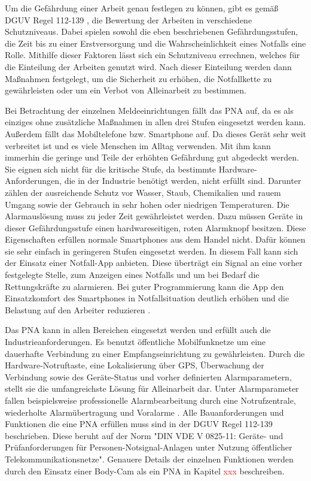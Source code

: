 \documentclass[thesis.tex]{subfiles}
\begin{document}
Um die Gefährdung einer Arbeit genau festlegen zu können, gibt es gemäß DGUV Regel 112-139 \cite[]{Regel_112-139}, die Bewertung der Arbeiten in verschiedene Schutzniveaus.
Dabei spielen sowohl die eben beschriebenen Gefährdungsstufen, die Zeit bis zu einer Erstversorgung und die Wahrscheinlichkeit eines Notfalls eine Rolle.
Mithilfe dieser Faktoren lässt sich ein Schutzniveau errechnen, welches für die Einteilung der Arbeiten genutzt wird.
Nach dieser Einteilung werden dann Maßnahmen festgelegt, um die Sicherheit zu erhöhen, die Notfallkette zu gewährleisten oder um ein Verbot von Alleinarbeit zu bestimmen.

Bei Betrachtung der einzelnen Meldeeinrichtungen fällt das PNA auf, da es als einziges ohne zusätzliche Maßnahmen in allen drei Stufen eingesetzt werden kann.
Außerdem fällt das Mobiltelefone bzw. Smartphone auf.
Da dieses Gerät sehr weit verbreitet ist und es viele Menschen im Alltag verwenden.
Mit ihm kann immerhin die geringe und Teile der erhöhten Gefährdung gut abgedeckt werden.
Sie eignen sich nicht für die kritische Stufe, da bestimmte Hardware-Anforderungen, die in der Industrie benötigt werden, nicht erfüllt sind.
Darunter zählen der ausreichende Schutz vor Wasser, Staub, Chemikalien und rauem Umgang sowie der Gebrauch in sehr hohen oder niedrigen Temperaturen.
Die Alarmauslösung muss zu jeder Zeit gewährleistet werden.
Dazu müssen Geräte in dieser Gefährdungsstufe einen hardwareseitigen, roten Alarmknopf besitzen.
Diese Eigenschaften erfüllen normale Smartphones aus dem Handel nicht.
Dafür können sie sehr einfach in geringeren Stufen eingesetzt werden.
In diesem Fall kann sich der Einsatz einer Notfall-App anbieten.
Diese überträgt ein Signal an eine vorher festgelegte Stelle, zum Anzeigen eines Notfalls und um bei Bedarf die Rettungskräfte zu alarmieren.
Bei guter Programmierung kann die App den Einsatzkomfort des Smartphones in Notfallsituation deutlich erhöhen und die Belastung auf den Arbeiter reduzieren \cite[vgl. S.2-5]{FAQ-PNAuAPP}.

Das PNA kann in allen Bereichen eingesetzt werden und erfüllt auch die Industrieanforderungen.
Es benutzt öffentliche Mobilfunknetze um eine dauerhafte Verbindung zu einer Empfangseinrichtung zu gewährleisten.
Durch die Hardware-Notruftaste, eine Lokalisierung über GPS, Überwachung der Verbindung sowie des Geräte-Status und vorher definierten Alarmparametern, stellt sie die umfangreichste Lösung für Alleinarbeit dar.
Unter Alarmparameter fallen beispielsweise professionelle Alarmbearbeitung durch eine Notrufzentrale, wiederholte Alarmübertragung und Voralarme \cite[vgl. S.2-5]{FAQ-PNAuAPP}.
Alle Bauanforderungen und Funktionen die eine PNA erfüllen muss sind in der DGUV Regel 112-139 \cite[]{Regel_112-139} beschrieben.
Diese beruht auf der Norm "DIN VDE V 0825-11: Geräte- und Prüfanforderungen für Personen-Notsignal-Anlagen unter Nutzung öffentlicher Telekommunikationsnetze".
Genauere Details der einzelnen Funktionen werden durch den Einsatz einer Body-Cam als ein PNA in Kapitel \textcolor{red}{xxx} beschreiben.
\end{document}
